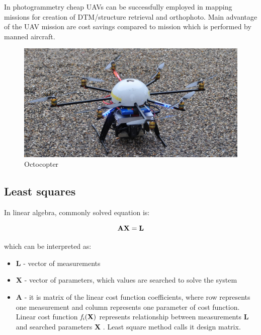 \documentclass[a4paper,12pt]{article}
\newcommand{\ematr}[1]{
{\bf #1}
}
\newcommand{\evect}[1]{
{\bf #1}
}
\newcommand{\efunc}[1]{
{\it #1}
}
\newcommand{\term}[1]{
{\it #1}
}
\begin{document}
In photogrammetry cheap UAVs can be successfully employed in mapping missions for creation of DTM/structure retrieval and orthophoto.
Main advantage of the UAV mission are cost savings compared to mission which is performed by manned aircraft.


\begin{figure}[h]
    \centering
    \includegraphics[scale=0.8]{figures/octocopter.jpg}
    \caption{Octocopter \cite{boe2013octocopter}}
    \label{fig:sample_figure}
\end{figure}


\subsection{Least squares}
\label{sec:least}


In linear algebra, commonly solved equation is:

\begin{equation}
\label{eq:linear_eq}
\ematr{A}\evect{X} = \evect{L} 
\end{equation} 



which can be interpreted as:
\begin{itemize}
\item \evect{L} - vector of measurements
\item \evect{X} - vector of parameters, which values are searched to solve the system
\item \ematr{A} - it is matrix of the linear cost function  coefficients,  where row represents one measurement 
		  and column represents one parameter of cost function. Linear cost function $\efunc{f_{i}(\evect{X})}$
		  represents relationship between measurements \evect{L} and searched parameters \evect{X}. 
		  Least square method calls it design matrix. 
\end{itemize}
\end{document}
